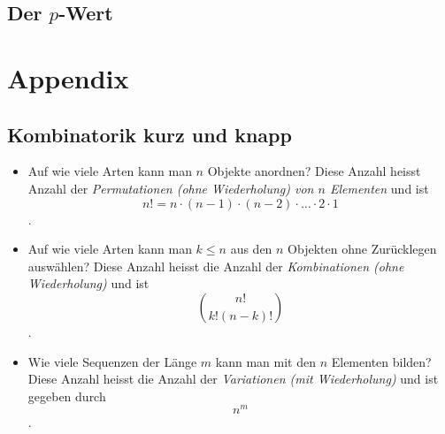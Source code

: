 \documentclass[a4paper,10pt]{article}
\begin{document}
\subsection{Der \( p \)-Wert}


\section{Appendix}

\subsection{Kombinatorik kurz und knapp}

\begin{itemize}
    \item Auf wie viele Arten kann man \( n \) Objekte anordnen? Diese Anzahl heisst Anzahl der \emph{Permutationen (ohne Wiederholung) von \( n \) Elementen} und ist \[ n! = n \cdot (n - 1) \cdot (n - 2) \cdot \dots \cdot 2 \cdot 1 \].
    \item Auf wie viele Arten kann man \( k \leq n \) aus den \( n \) Objekten ohne Zurücklegen auswählen? Diese Anzahl heisst die Anzahl der \emph{Kombinationen (ohne Wiederholung)} und ist \[ \binom{n!}{k! (n - k)!} \].
    \item Wie viele Sequenzen der Länge \( m \) kann man mit den \( n \) Elementen bilden? Diese Anzahl heisst die Anzahl der \emph{Variationen (mit Wiederholung)} und ist gegeben durch \[ n^m \].
\end{itemize}
\end{document}

